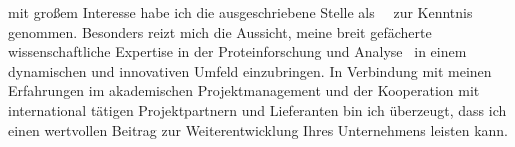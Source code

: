 

                 {\def\phrase{Lehre}}{}
            {\def\phrase{Forschungsmanagement}}{}
             {\def\phrase{industriellen Forschung}}{}
            {\def\phrase{strategischen Geschäftsentwicklung}}{}
            {\def\phrase{industriellen Produktion}}{}
                    {\def\phrase{Qualitätsmanagement}}{}
                   {\def\phrase{sowie meine Managements- und Führungskompetenzen}}{\def\phrase{}}
                    {\def\phrase{Qualitätsmanagement}}{}
                {\def\phrase{Qualitätsmanagement}}{}
  {\def\phrase{Sicherheit}}{}
             {\def\phrase{Marketing}}{}
mit großem Interesse habe ich die ausgeschriebene Stelle als \stelleText~\firmaText~zur Kenntnis genommen. Besonders reizt mich die Aussicht, meine breit gefächerte wissenschaftliche Expertise in der Proteinforschung und Analyse \phrase~in einem dynamischen und innovativen Umfeld einzubringen. In Verbindung mit meinen Erfahrungen im akademischen Projektmanagement und der Kooperation mit international tätigen Projektpartnern und Lieferanten bin ich überzeugt, dass ich einen wertvollen Beitrag zur Weiterentwicklung Ihres Unternehmens leisten kann. \par
